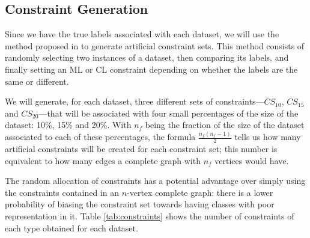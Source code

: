\documentclass[review]{elsarticle}
\begin{document}
\clearpage

\subsection{Constraint Generation} \label{sec:ConstGent}

Since we have the true labels associated with each dataset, we will use the method proposed in \cite{wagstaff2001constrained} to generate artificial constraint sets. This method consists of randomly selecting two instances of a dataset, then comparing its labels, and finally setting an ML or CL constraint depending on whether the labels are the same or different.

We will generate, for each dataset, three different sets of constraints---$CS_{10}$, $CS_{15}$ and $CS_{20}$---that will be associated with four small percentages of the size of the dataset: 10\%, 15\% and 20\%. With $n_f$ being the fraction of the size of the dataset associated to each of these percentages, the formula $\frac{n_f(n_f-1)}{2}$ tells us how many artificial constraints will be created for each constraint set; this number is equivalent to how many edges a complete graph with $n_f$ vertices would have.

The random allocation of constraints has a potential advantage over simply using the constraints contained in an $n$-vertex complete graph: there is a lower probability of biasing the constraint set towards having classes with poor representation in it. Table \ref{tab:constraints} shows the number of constraints of each type obtained for each dataset.
\end{document}
